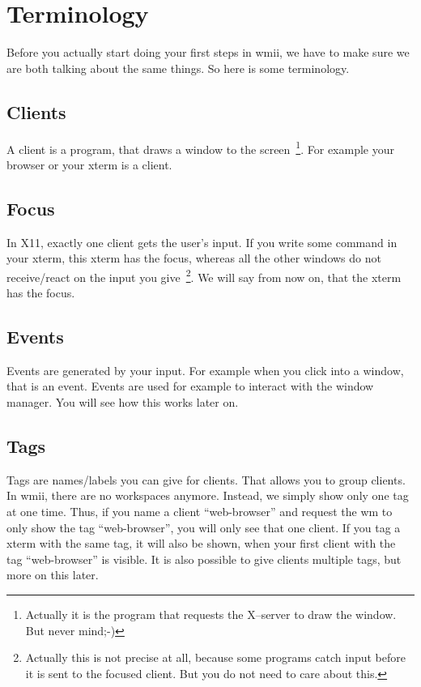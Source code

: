 \documentclass[12pt,a4paper]{article} %
\begin{document}
\section{Terminology}
\label{sec:terms}  

  Before you actually start doing your first steps in wmii, we have to
  make sure we are both talking about the same things. So here is some
  terminology.

  \subsection{Clients}

    A client is a program, that draws a window to the
    screen~\footnote{ Actually it is the program that requests the
    X--server to draw the window. But never mind;-)}.  For example your
    browser or your xterm is a client.
  
  \subsection{Focus}

    In X11, exactly one client gets the user's input. If you write some
    command in your xterm, this xterm has the focus, whereas all the
    other windows do not receive/react on the input you
    give~\footnote{ Actually this is not precise at all, because some
    programs catch input before it is sent to the focused client. But
    you do not need to care about this.}.  We will say from now on,
    that the xterm has the focus.
  
  \subsection{Events}

    Events are generated by your input. For example when you click
    into a window, that is an event. Events are used for example to
    interact with the window manager. You will see how this works
    later on.
  
  \subsection{Tags}

    Tags are names/labels you can give for clients. That allows you to
    group clients.  In wmii, there are no workspaces anymore. Instead,
    we simply show only one tag at one time. Thus, if you name a
    client ``web-browser'' and request the wm to only show the tag
    ``web-browser'', you will only see that one client. If you tag a
    xterm with the same tag, it will also be shown, when your first
    client with the tag ``web-browser'' is visible. It is also possible
    to give clients multiple tags, but more on this later.
\end{document}
